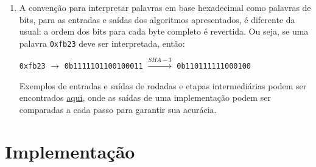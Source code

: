 \documentclass{article}
\begin{document}
\begin{enumerate}[label=(\alph*)]
\item A convenção para interpretar palavras em base hexadecimal como palavras
de bits, para as entradas e saídas dos algoritmos apresentados, é diferente da
usual: a ordem dos bits para cada byte completo é revertida. Ou seja, se uma
palavra \texttt{0xfb23} deve ser interpretada, então:

\texttt{0xfb23} $\longrightarrow$ \texttt{0b1111101100100011}
$\stackrel{SHA-3}{\longrightarrow}$ \texttt{0b110111111000100}

Exemplos de entradas e saídas de rodadas e etapas intermediárias podem ser
encontrados
\href{http://csrc.nist.gov/groups/ST/toolkit/examples.html#aHashing}
{aqui}, onde as saídas de uma implementação podem ser comparadas a cada passo
para garantir sua acurácia.

\end{enumerate}

\section{Implementação}
\end{document}
